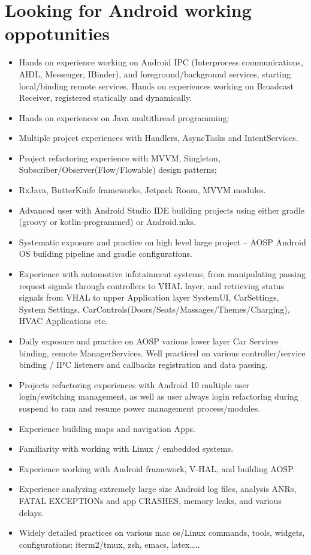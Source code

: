 \documentclass[9pt, b5paaper]{book}
\begin{document}
\chapter{Looking for Android working oppotunities}
\label{sec-6}
\begin{itemize}
\item Hands on experience working on Android IPC (Interprocess communications, AIDL, Messenger, IBinder), and foreground/background services, starting local/binding remote services. Hands on experiences working on Broadcast Receiver, registered statically and dynamically.
\item Hands on experiences on Java multithread programming;
\item Multiple project experiences with Handlers, AsyncTasks and IntentServices.
\item Project refactoring experience with MVVM, Singleton, Subscriber/Observer(Flow/Flowable) design patterns;
\item RxJava, ButterKnife frameworks, Jetpack Room, MVVM modules.
\item Advanced user with Android Studio IDE building projects using either gradle (groovy or kotlin-programmed) or Android.mks.
\item Systematic exposure and practice on high level large project -- AOSP Android OS building pipeline and gradle configurations.
\item Experience with automotive infotainment systems, from manipulating passing request signals through controllers to VHAL layer, and retrieving status signals from VHAL to upper Application layer SystemUI, CarSettings, System Settings, CarControls(Doors/Seats/Massages/Themes/Charging), HVAC Applications etc.
\item Daily exposure and practice on AOSP various lower layer Car Services binding, remote ManagerServices. Well practiced on various controller/service binding / IPC listeners and callbacks registration and data passing.
\item Projects refactoring experiences with Android 10 multiple user login/switching management, as well as user always login refactoring during suspend to ram and resume power management process/modules.
\item Experience building maps and navigation Apps.
\item Familiarity with working with Linux / embedded systems.
\item Experience working with Android framework, V-HAL, and building AOSP.
\item Experience analyzing extremely large size Android log files, analysis ANRs, FATAL EXCEPTIONs and app CRASHES, memory leaks, and various delays.
\item Widely detailed practices on various mac os/Linux commands, tools, widgets, configurations: iterm2/tmux, zsh, emacs, latex\ldots{}..
\end{itemize}
\end{document}
